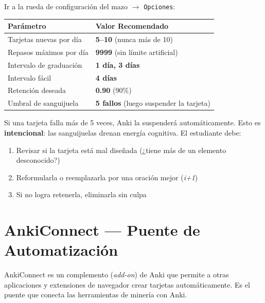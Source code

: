 \documentclass[12pt,a4paper]{article}
\begin{document}
\begin{cajapaso}
Ir a la rueda de configuración del mazo $\rightarrow$ \texttt{Opciones}:

\medskip
\begin{tabularx}{\textwidth}{@{} l X @{}}
\toprule
\textbf{Parámetro} & \textbf{Valor Recomendado} \\
\midrule
Tarjetas nuevas por día & \textbf{5--10} (nunca más de 10) \\
Repasos máximos por día & \textbf{9999} (sin límite artificial) \\
Intervalo de graduación & \textbf{1 día, 3 días} \\
Intervalo fácil & \textbf{4 días} \\
Retención deseada & \textbf{0.90} (90\%) \\
Umbral de sanguijuela & \textbf{5 fallos} (luego suspender la tarjeta) \\
\bottomrule
\end{tabularx}
\end{cajapaso}

\begin{cajaalerta}
Si una tarjeta falla más de 5 veces, Anki la suspenderá automáticamente. Esto es \textbf{intencional}: las sanguijuelas drenan energía cognitiva. El estudiante debe:
\begin{enumerate}[leftmargin=1.2cm, nosep]
  \item Revisar si la tarjeta está mal diseñada (¿tiene más de un elemento desconocido?)
  \item Reformularla o reemplazarla por una oración mejor (\textit{i+1})
  \item Si no logra retenerla, eliminarla sin culpa
\end{enumerate}
\end{cajaalerta}

\section{AnkiConnect — Puente de Automatización}

\begin{cajaherramienta}
AnkiConnect es un complemento (\textit{add-on}) de Anki que permite a otras aplicaciones y extensiones de navegador crear tarjetas automáticamente. Es el puente que conecta las herramientas de minería con Anki.
\end{cajaherramienta}
\end{document}

